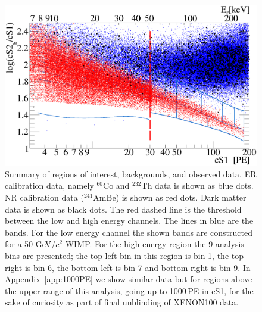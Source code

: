 \begin{figure}[]
\begin{minipage}{1\linewidth}
\centerline{\includegraphics[width=1\linewidth]{Figures/eft_sr.eps}}
\end{minipage}
\caption{Summary of regions of interest, backgrounds, and observed data. ER calibration data, namely $^{60}\mathrm{Co}$ and $^{232}\mathrm{Th}$ data is shown as blue dots. NR calibration data ($^{241}$AmBe) is shown as red dots. Dark matter data is shown as black dots. The red dashed line is the threshold between the low and high energy channels. The lines in blue are the bands. For the low energy channel the shown bands are constructed for a 50 GeV/$c^2$ WIMP. For the high energy region the 9 analysis bins are presented; the top left bin in this region is bin 1, the top right is bin 6, the bottom left is bin 7 and bottom right is bin 9. In Appendix~\ref{app:1000PE} we show similar data but for regions above the upper range of this analysis, going up to 1000\,PE in cS1, for the sake of curiosity as part of final unblinding of XENON100 data. 
}
\label{fig:phasespace}
\end{figure}  





